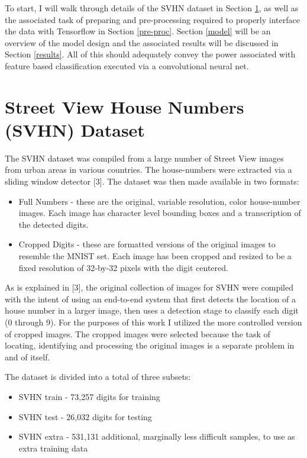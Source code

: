 \documentclass{article}
\begin{document}
	To start, I will walk through details of the SVHN dataset in Section \ref{dt_set}, as well as the associated task of preparing and pre-processing required to properly interface the data with Tensorflow in Section \ref{pre-proc}.  Section \ref{model} will be an overview of the model design and the associated results will be discussed in Section \ref{results}.  All of this should adequately convey the power associated with feature based classification executed via a convolutional neural net.
	
	\section{Street View House Numbers (SVHN) Dataset}
	\label{dt_set}
		
	The SVHN dataset was compiled from a large number of Street View images from urban areas in various countries.  The house-numbers were extracted via a sliding window detector [3].  The dataset was then made available in two formats:
	
	\begin{itemize}
		\item Full Numbers - these are the original, variable resolution, color house-number images. Each image has character level bounding boxes and a transcription of the detected digits.
		
		\item Cropped Digits - these are formatted versions of the original images to resemble the MNIST set. Each image has been cropped and resized to be a fixed resolution of 32-by-32 pixels with the digit centered.
		  
	\end{itemize}
	
	As is explained in [3], the original collection of images for SVHN were compiled with the intent of using an end-to-end system that first detects the location of a house number in a larger image, then uses a detection stage to classify each digit (0 through 9).  For the purposes of this work I utilized the more controlled version of cropped images.  The cropped images were selected because the task of locating, identifying and processing the original images is a separate problem in and of itself.
	
	The dataset is divided into a total of three subsets:
	
	\begin{itemize}
		
		\item SVHN train - 73,257 digits for training
		\item SVHN test - 26,032 digits for testing
		\item SVHN extra - 531,131 additional, marginally less difficult samples, to use as extra training data
		
	\end{itemize}
\end{document}
